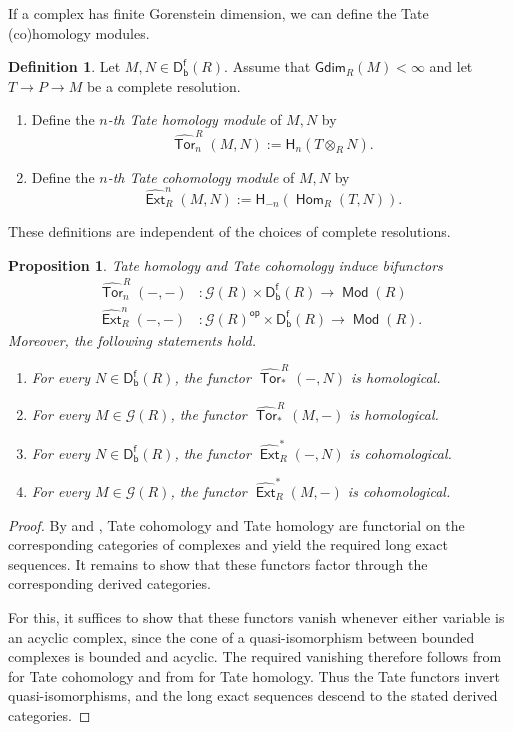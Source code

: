 \documentclass[10pt, a4paper,reqno]{amsart}
\newtheorem{prop}[prop]{Proposition}
\theoremstyle{definition}
\newtheorem{dfn}[dfn]{Definition}
\theoremstyle{remark}
\numberwithin{equation}{thm}
\def\cG{\mathcal{G}}
\def\sH{\mathsf{H}}
\def\Ext{\operatorname{\mathsf{Ext}}}
\def\Hom{\operatorname{\mathsf{Hom}}}
\def\Mod{\operatorname{\mathsf{Mod}}}
\def\Tor{\operatorname{\mathsf{Tor}}}
\def\Dfb{\mathsf{D^f_b}}
\def\Gdim{\mathsf{Gdim}}
\def\op{\mathsf{op}}
\begin{document}
If a complex has finite Gorenstein dimension, we can define the Tate (co)homology modules.

\begin{dfn}
Let $M,N \in \Dfb(R)$.
Assume that $\Gdim_R(M)< \infty$ and let $T \to P \to M$ be a complete resolution.

\begin{enumerate}[\rm(1)]
\item
Define the {\em $n$-th Tate homology module} of $M,N$ by 
\[
\widehat{\Tor}_n^R(M,N) := \sH_n(T \otimes_R N).  
\]	

\item
Define the {\em $n$-th Tate cohomology module} of $M,N$ by 
\[
\widehat{\Ext}^n_R(M,N) := \sH_{-n}(\Hom_R(T, N)).  
\]	
\end{enumerate}
These definitions are independent of the choices of complete resolutions.
\end{dfn}


\begin{prop}\label{tate-functor}
Tate homology and Tate cohomology induce bifunctors
\begin{align*}
\widehat{\Tor}^R_n(-,-)&: \cG(R)\times\Dfb(R)\longrightarrow \Mod(R) \\
\widehat{\Ext}_R^n(-,-)&: \cG(R)^\op\times\Dfb(R)\longrightarrow \Mod(R).
\end{align*}
Moreover, the following statements hold.
\begin{enumerate}[\rm(1)]
\item
For every $N\in\Dfb(R)$, the functor $\widehat{\Tor}^R_*(-,N)$ is homological. 

\item
For every $M\in\cG(R)$, the functor $\widehat{\Tor}^R_*(M,-)$ is homological.

\item
For every $N\in\Dfb(R)$, the functor $\widehat{\Ext}_R^*(-,N)$ is cohomological.

\item
For every $M\in\cG(R)$, the functor $\widehat{\Ext}_R^*(M,-)$ is cohomological.
\end{enumerate}
\end{prop}

\begin{proof}
By \cite[Propositions 4.6, 4.8]{Vel} and \cite[Propositions 2.8, 2.9]{CJ}, Tate cohomology and Tate homology are functorial on the corresponding categories of complexes and yield the required long exact sequences.
It remains to show that these functors factor through the corresponding derived categories.

For this, it suffices to show that these functors vanish whenever either variable is an acyclic complex, since the cone of a quasi-isomorphism between bounded complexes is bounded and acyclic.
The required vanishing therefore follows from \cite[Theorem 4.5]{Vel} for Tate cohomology and from \cite[Proposition 2.5 and Lemma 2.7]{CJ} for Tate homology.
Thus the Tate functors invert quasi-isomorphisms, and the long exact sequences descend to the stated derived categories.
\end{proof}
\end{document}
